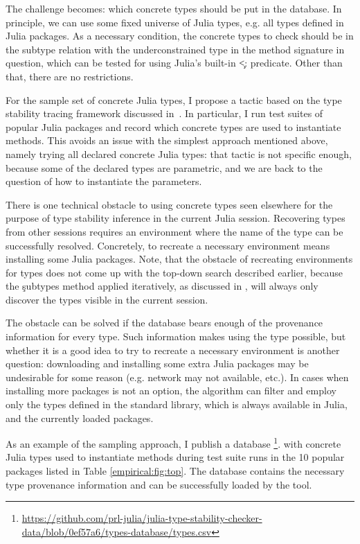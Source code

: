 The challenge becomes: which concrete types should be put in the database. In
principle, we can use some fixed universe of Julia types, e.g. all types defined
in Julia packages. As a necessary condition, the concrete types to check should
be in the subtype relation with the underconstrained type in the method
signature in question, which can be tested for using Julia's built-in \c{<:}
predicate. Other than that, there are no restrictions.

For the sample set of concrete Julia types, I propose a tactic based on the type
stability tracing framework discussed in~. In
particular, I run test suites of popular Julia packages and record which
concrete types are used to instantiate methods.
This avoids an issue with the simplest approach mentioned above, namely trying
all declared concrete Julia types: that tactic is not specific enough,
because some of the declared types are parametric, and we are back to the
question of how to instantiate the parameters.

There is one technical obstacle to using concrete types seen elsewhere for the purpose
of type stability inference in the current Julia session. Recovering types from
other sessions requires an environment where the name of the type can be
successfully resolved. Concretely, to recreate a necessary environment means
installing some Julia packages.
Note, that the obstacle of recreating environments for types does not come up
with the top-down search described earlier, because the \c{subtypes} method
applied iteratively, as discussed in , will always only
discover the types visible in the current session.

The obstacle can be solved if the database bears enough
of the provenance information for every type. Such information makes using the
type possible, but whether it is a good idea to try to recreate a necessary
environment is another question: downloading and
installing some extra Julia packages may be undesirable for some reason (e.g.
network may not available, etc.). In cases when installing more packages is not
an option, the algorithm can filter and
employ only the types defined in the standard library, which is always available
in Julia, and the currently loaded packages.

As an example of the sampling approach, I publish a database
\footnote{%
  \url{https://github.com/prl-julia/julia-type-stability-checker-data/blob/0ef57a6/types-database/types.csv}}.
with concrete Julia types used to instantiate methods during test suite runs in
the 10 popular packages listed in Table \ref{empirical:fig:top}. The database
contains the necessary type provenance information and can be successfully
loaded by the tool.

